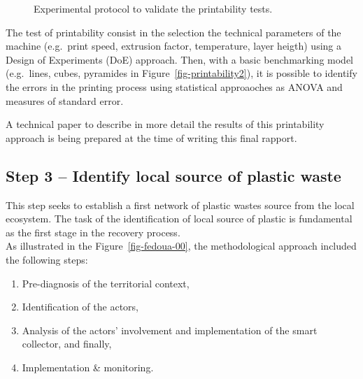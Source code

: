 \documentclass[
  11pt,
]{article}
\providecommand{\tightlist}{%
  \setlength{\itemsep}{0pt}\setlength{\parskip}{0pt}}\usepackage{longtable,booktabs,array}
\begin{document}
\begin{figure}
\begin{minipage}[t]{\linewidth}
{{}

}

\end{minipage}%

\caption{\label{fig-printability}Experimental protocol to validate the
printability tests.}

\end{figure}

The test of printability consist in the selection the technical
parameters of the machine (e.g.~print speed, extrusion factor,
temperature, layer heigth) using a Design of Experiments (DoE) approach.
Then, with a basic benchmarking model (e.g.~lines, cubes, pyramides in
Figure~\ref{fig-printability2}), it is possible to identify the errors
in the printing process using statistical approaoches as ANOVA and
measures of standard error.

A technical paper to describe in more detail the results of this
printability approach is being prepared at the time of writing this
final rapport.

\hypertarget{step-3-identify-local-source-of-plastic-waste}{%
\subsection{Step 3 -- Identify local source of plastic
waste}\label{step-3-identify-local-source-of-plastic-waste}}

This step seeks to establish a first network of plastic wastes source
from the local ecosystem. The task of the identification of local source
of plastic is fundamental as the first stage in the recovery process.\\
As illustrated in the Figure~\ref{fig-fedoua-00}, the methodological
approach included the following steps:

\begin{enumerate}
\def\labelenumi{\arabic{enumi}.}
\tightlist
\item
  Pre-diagnosis of the territorial context,
\item
  Identification of the actors,
\item
  Analysis of the actors' involvement and implementation of the smart
  collector, and finally,
\item
  Implementation \& monitoring.
\end{enumerate}
\end{document}
